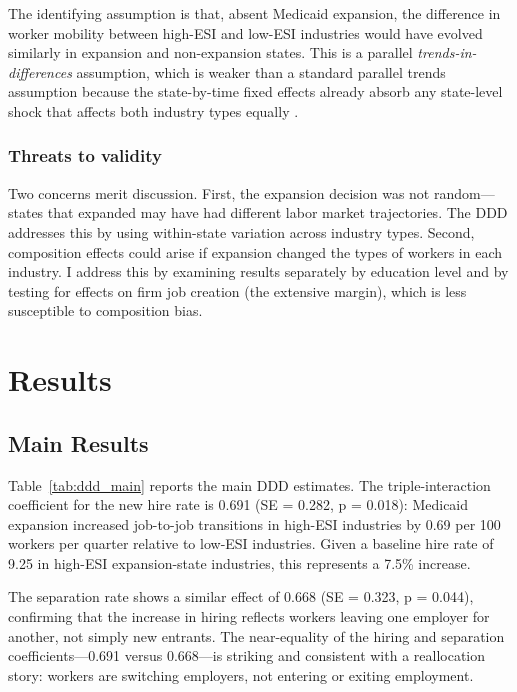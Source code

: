 \documentclass[12pt]{article}
\begin{document}
The identifying assumption is that, absent Medicaid expansion, the difference in worker mobility between high-ESI and low-ESI industries would have evolved similarly in expansion and non-expansion states. This is a parallel \textit{trends-in-differences} assumption, which is weaker than a standard parallel trends assumption because the state-by-time fixed effects already absorb any state-level shock that affects both industry types equally \citep{roth2023parallel}.

\subsubsection*{Threats to validity} Two concerns merit discussion. First, the expansion decision was not random---states that expanded may have had different labor market trajectories. The DDD addresses this by using within-state variation across industry types. Second, composition effects could arise if expansion changed the types of workers in each industry. I address this by examining results separately by education level and by testing for effects on firm job creation (the extensive margin), which is less susceptible to composition bias.

\section{Results}

\subsection{Main Results}

{\small}

Table~\ref{tab:ddd_main} reports the main DDD estimates. The triple-interaction coefficient for the new hire rate is 0.691 (SE = 0.282, p = 0.018): Medicaid expansion increased job-to-job transitions in high-ESI industries by 0.69 per 100 workers per quarter relative to low-ESI industries. Given a baseline hire rate of 9.25 in high-ESI expansion-state industries, this represents a 7.5\% increase.

The separation rate shows a similar effect of 0.668 (SE = 0.323, p = 0.044), confirming that the increase in hiring reflects workers leaving one employer for another, not simply new entrants. The near-equality of the hiring and separation coefficients---0.691 versus 0.668---is striking and consistent with a reallocation story: workers are switching employers, not entering or exiting employment.
\end{document}
